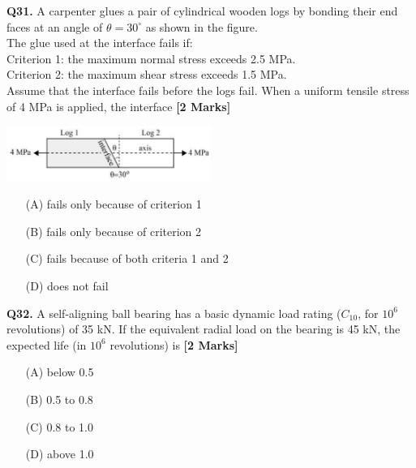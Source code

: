 \documentclass[11pt]{article}
\newcommand{\questionb}[2]{
    \noindent\textbf{Q#2.} #1 \hfill \textbf{[2 Marks]}
}
\begin{document}
\questionb{A carpenter glues a pair of cylindrical wooden logs by bonding their end faces at an angle of \( \theta = 30^\circ \) as shown in the figure. \\
The glue used at the interface fails if: \\
Criterion 1: the maximum normal stress exceeds 2.5 MPa. \\
Criterion 2: the maximum shear stress exceeds 1.5 MPa. \\
Assume that the interface fails before the logs fail. When a uniform tensile stress of 4 MPa is applied, the interface}{31}
\begin{center}
\includegraphics[width=0.5\textwidth]{figures/31.png}
\end{center}
\begin{enumerate}
    \item[(A)] fails only because of criterion 1
    \item[(B)] fails only because of criterion 2
    \item[(C)] fails because of both criteria 1 and 2
    \item[(D)] does not fail
\end{enumerate}
\vspace{0.5cm}

\questionb{A self-aligning ball bearing has a basic dynamic load rating (\( C_{10} \), for \( 10^6 \) revolutions) of 35 kN. If the equivalent radial load on the bearing is 45 kN, the expected life (in \( 10^6 \) revolutions) is}{32}
\begin{enumerate}
    \item[(A)] below 0.5
    \item[(B)] 0.5 to 0.8
    \item[(C)] 0.8 to 1.0
    \item[(D)] above 1.0
\end{enumerate}
\vspace{0.5cm}
\end{document}
